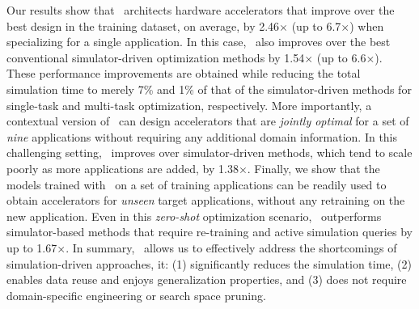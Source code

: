 Our results show that \primemethodname\ architects hardware accelerators that improve over the best design in the training dataset, on average, by 2.46$\times$ (up to 6.7$\times$) when specializing for a single application. 
%
In this case, \primemethodname\ also improves over the best conventional simulator-driven optimization methods by 1.54$\times$ (up to 6.6$\times$).
%
These performance improvements are obtained while reducing the total simulation time to merely 7\% and 1\% of that of the simulator-driven methods for single-task and multi-task optimization, respectively.
%
More importantly, a contextual version of \primemethodname\ can design accelerators that are \emph{jointly optimal} for a set of \textit{nine} applications without requiring any additional domain information.
%
In this challenging setting, \primemethodname\ improves over simulator-driven methods, which tend to scale poorly as more applications are added, by 1.38$\times$.
%
Finally, we show that the models trained with \primemethodname\ on a set of training applications can be readily used to obtain accelerators for \textit{unseen} target applications, without any retraining on the new application.
%
Even in this \emph{zero-shot} optimization scenario, \primemethodname\ outperforms simulator-based methods that require re-training and active simulation queries by up to 1.67$\times$.
%
In summary, \primemethodname\ allows us to effectively address the shortcomings of simulation-driven approaches, it: (1) significantly reduces the simulation time, (2) enables data reuse and enjoys generalization properties, and (3) does not require domain-specific engineering or search space pruning.
%
